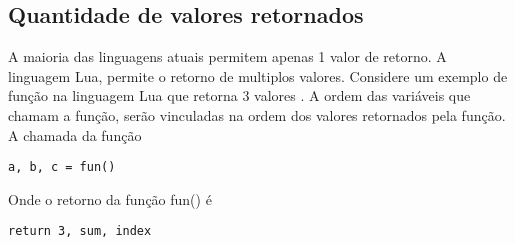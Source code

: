 \subsection{Quantidade de valores retornados}
\label{sub:quantidade_de_valores_retornados}
A maioria das linguagens atuais permitem apenas 1 valor de retorno. A linguagem Lua, permite o retorno de multiplos valores. Considere um exemplo de função na linguagem Lua que retorna 3 valores \cite{sebesta}. A ordem das variáveis que chamam a função, serão vinculadas na ordem dos valores retornados pela função. \\

\noindent A chamada da função

\begin{verbatim}
a, b, c = fun() 
\end{verbatim}
Onde o retorno da função fun() é 
\begin{verbatim}
return 3, sum, index
\end{verbatim}

